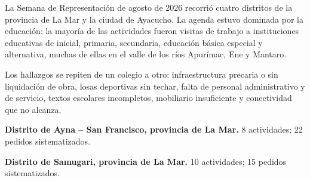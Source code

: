 \documentclass{informe-sr}
\begin{document}
\clearpage
{}
\noindent
{}\hfill
{}\hfill
{}\hfill
{}\par
\vspace{16pt}
\begin{columnas}
La Semana de Representación de agosto de 2026 recorrió cuatro distritos
de la provincia de La Mar y la ciudad de Ayacucho. La agenda estuvo
dominada por la educación: la mayoría de las actividades fueron visitas
de trabajo a instituciones educativas de inicial, primaria, secundaria,
educación básica especial y alternativa, muchas de ellas en el valle de
los ríos Apurímac, Ene y Mantaro.

Los hallazgos se repiten de un colegio a otro: infraestructura precaria
o sin liquidación de obra, losas deportivas sin techar, falta de
personal administrativo y de servicio, textos escolares incompletos,
mobiliario insuficiente y conectividad que no alcanza.
\end{columnas}
\begin{isrcrono}
  \item[24 de agosto] \textbf{Distrito de Ayna – San Francisco, provincia de La Mar.} 8 actividades; 22 pedidos sistematizados.
  \item[25 de agosto] \textbf{Distrito de Samugari, provincia de La Mar.} 10 actividades; 15 pedidos sistematizados.
\end{isrcrono}
\end{document}
